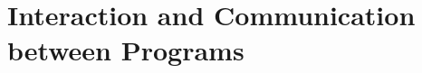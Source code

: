 \documentclass{memoir}
\begin{document}


\part{ Interaction and Communication between Programs}
\end{document}
